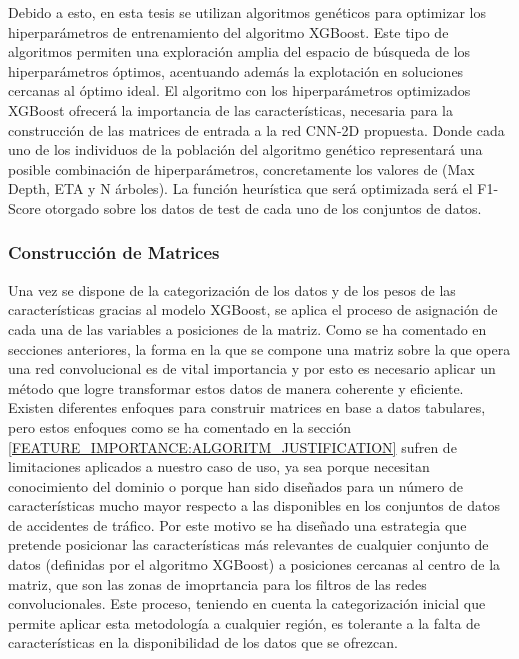 \documentclass{uathesis-es}
\begin{document}
Debido a esto, en esta tesis se utilizan algoritmos genéticos para optimizar los hiperparámetros de entrenamiento del algoritmo XGBoost. Este tipo de algoritmos permiten una exploración amplia del espacio de búsqueda de los hiperparámetros óptimos, acentuando además la explotación en soluciones cercanas al óptimo ideal. El algoritmo con los hiperparámetros optimizados XGBoost ofrecerá la importancia de las características, necesaria para la construcción de las matrices de entrada a la red CNN-2D propuesta. Donde cada uno de los individuos de la población del algoritmo genético representará una posible combinación de hiperparámetros, concretamente los valores de (Max Depth, ETA y N árboles). La función heurística que será optimizada será el F1-Score otorgado sobre los datos de test de cada uno de los conjuntos de datos.

\subsubsection{Construcción de Matrices}

Una vez se dispone de la categorización de los datos y de los pesos de las características gracias al modelo XGBoost, se aplica el proceso de asignación de cada una de las variables a posiciones de la matriz. Como se ha comentado en secciones anteriores, la forma en la que se compone una matriz sobre la que opera una red convolucional es de vital importancia y por esto es necesario aplicar un método que logre transformar estos datos de manera coherente y eficiente. Existen diferentes enfoques para construir matrices en base a datos tabulares, pero estos enfoques como se ha comentado en la sección \ref{FEATURE_IMPORTANCE:ALGORITM_JUSTIFICATION} sufren de limitaciones aplicados a nuestro caso de uso, ya sea porque necesitan conocimiento del dominio o porque han sido diseñados para un número de características mucho mayor respecto a las disponibles en los conjuntos de datos de accidentes de tráfico. Por este motivo se ha diseñado una estrategia que pretende posicionar las características más relevantes de cualquier conjunto de datos (definidas por el algoritmo XGBoost) a posiciones cercanas al centro de la matriz, que son las zonas de imoprtancia para los filtros de las redes convolucionales. Este proceso, teniendo en cuenta la categorización inicial que permite aplicar esta metodología a cualquier región, es tolerante a la falta de características en la disponibilidad de los datos que se ofrezcan.
\end{document}
